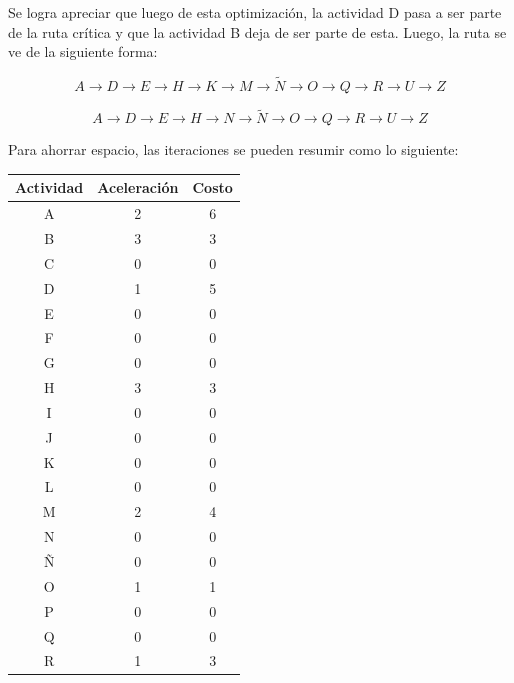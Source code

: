 \documentclass[]{article}
\begin{document}
Se logra apreciar que luego de esta optimización, la actividad D pasa a ser parte de la ruta crítica y que la actividad B deja de ser parte de esta. Luego, la ruta se ve de la siguiente forma:

$$A\longrightarrow{}D\longrightarrow{}E\longrightarrow{}H\longrightarrow{}K\longrightarrow{}M\longrightarrow{}\tilde{N}\longrightarrow{}O\longrightarrow{}Q\longrightarrow{}R\longrightarrow{}U\longrightarrow{}Z$$

$$A\longrightarrow{}D\longrightarrow{}E\longrightarrow{}H\longrightarrow{}N\longrightarrow{}\tilde{N}\longrightarrow{}O\longrightarrow{}Q\longrightarrow{}R\longrightarrow{}U\longrightarrow{}Z$$

\newpage
Para ahorrar espacio, las iteraciones se pueden resumir como lo siguiente:

\begin{table}[ht]
\centering
\begin{tabular}{|c|c|c|}
\hline
Actividad & Aceleración & Costo \\ \hline
A         & 2           & 6     \\ \hline
B         & 3           & 3     \\ \hline
C         & 0           & 0     \\ \hline
D         & 1           & 5     \\ \hline
E         & 0           & 0     \\ \hline
F         & 0           & 0     \\ \hline
G         & 0           & 0     \\ \hline
H         & 3           & 3     \\ \hline
I         & 0           & 0     \\ \hline
J         & 0           & 0     \\ \hline
K         & 0           & 0     \\ \hline
L         & 0           & 0     \\ \hline
M         & 2           & 4     \\ \hline
N         & 0           & 0     \\ \hline
Ñ         & 0           & 0     \\ \hline
O         & 1           & 1     \\ \hline
P         & 0           & 0     \\ \hline
Q         & 0           & 0     \\ \hline
R         & 1           & 3     \\ \hline

\end{tabular}
\end{table}
\end{document}
